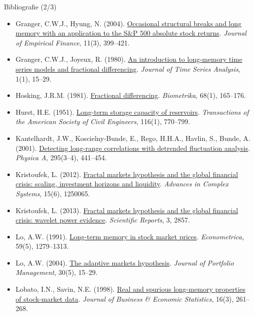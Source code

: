 \begin{frame}{Bibliografie (2/3)}
\itemsize{\tiny}
\begin{itemize}
    \item Granger, C.W.J., Hyung, N. (2004). \href{https://doi.org/10.1016/j.jempfin.2003.03.001}{Occasional structural breaks and long memory with an application to the S\&P 500 absolute stock returns}. \textit{Journal of Empirical Finance}, 11(3), 399--421.
    \item Granger, C.W.J., Joyeux, R. (1980). \href{https://doi.org/10.1111/j.1467-9892.1980.tb00297.x}{An introduction to long-memory time series models and fractional differencing}. \textit{Journal of Time Series Analysis}, 1(1), 15--29.
    \item Hosking, J.R.M. (1981). \href{https://doi.org/10.1093/biomet/68.1.165}{Fractional differencing}. \textit{Biometrika}, 68(1), 165--176.
    \item Hurst, H.E. (1951). \href{https://doi.org/10.1061/TACEAT.0006518}{Long-term storage capacity of reservoirs}. \textit{Transactions of the American Society of Civil Engineers}, 116(1), 770--799.
    \item Kantelhardt, J.W., Koscielny-Bunde, E., Rego, H.H.A., Havlin, S., Bunde, A. (2001). \href{https://doi.org/10.1016/S0378-4371(01)00144-3}{Detecting long-range correlations with detrended fluctuation analysis}. \textit{Physica A}, 295(3--4), 441--454.
    \item Kristoufek, L. (2012). \href{https://doi.org/10.1142/S0219525912500658}{Fractal markets hypothesis and the global financial crisis: scaling, investment horizons and liquidity}. \textit{Advances in Complex Systems}, 15(6), 1250065.
    \item Kristoufek, L. (2013). \href{https://doi.org/10.1038/srep02857}{Fractal markets hypothesis and the global financial crisis: wavelet power evidence}. \textit{Scientific Reports}, 3, 2857.
    \item Lo, A.W. (1991). \href{https://doi.org/10.2307/2938368}{Long-term memory in stock market prices}. \textit{Econometrica}, 59(5), 1279--1313.
    \item Lo, A.W. (2004). \href{https://doi.org/10.3905/jpm.2004.442611}{The adaptive markets hypothesis}. \textit{Journal of Portfolio Management}, 30(5), 15--29.
    \item Lobato, I.N., Savin, N.E. (1998). \href{https://doi.org/10.1080/07350015.1998.10524760}{Real and spurious long-memory properties of stock-market data}. \textit{Journal of Business \& Economic Statistics}, 16(3), 261--268.

\end{itemize}
\end{frame}

